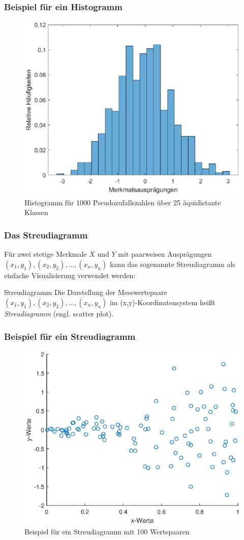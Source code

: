 \begin{frame}
\frametitle{Beispiel für ein Histogramm}
\begin{figure}[hbtp]
\centering
\includegraphics[scale=0.55]{images/plot_histogram.eps}
\caption{Histogramm für 1000 Pseudozufallszahlen über 25 äquidistante Klassen}
\end{figure}
\end{frame}
\begin{frame}
\frametitle{Das Streudiagramm}
Für zwei stetige Merkmale $X$ und $Y$ mit paarweisen Ausprägungen $(x_1,y_1),(x_2,y_2),\ldots,(x_n,y_n)$ kann das sogenannte Streudiagramm als einfache Visualisierung verwendet werden:
\begin{block}{Streudiagramm}
Die  Darstellung  der  Messwertepaare $(x_1,y_1),(x_2,y_2),\ldots,(x_n,y_n)$ im (x,y)-Koordinatensystem heißt \textit{Streudiagramm} (engl. scatter plot).
\end{block}
\end{frame}
\begin{frame}
\frametitle{Beispiel für ein Streudiagramm}
\begin{figure}[hbtp]
\centering
\includegraphics[scale=0.55]{images/plot_scatter.eps}
\caption{Beispiel für ein Streudiagramm mit 100 Wertepaaren}
\end{figure}
\end{frame}
